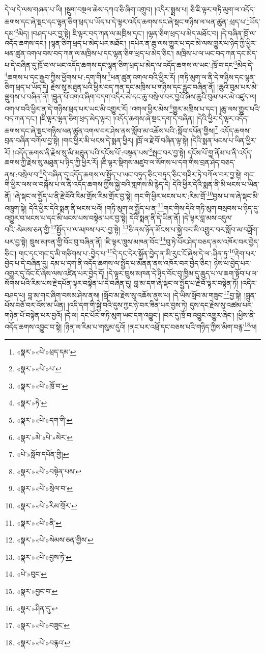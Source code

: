 དེ་ལ་དེ་ལས་གཞན་པ་ཡི། །སྡུག་བསྔལ་ཆེས་དཀའ་ཅི་ཞིག་འགྲུབ། །འདིར་སྨྲས་པ། ཅི་ཇི་ལྟར་གཏི་མུག་ལ་འདོད་ཆགས་དང་ཞེ་སྡང་དང་ལྷན་ཅིག་ཕྲད་པ་ཡོད་པ་དེ་ལྟར་འདོད་ཆགས་དང་ཞེ་སྡང་གཉིས་ལ་ཕན་ཚུན་:ཕྲད་པ་\footnote{«སྣར་»«པེ་»ཕྲད་དམ་}ཡོད་དམ་\footnote{«སྣར་»«པེ་»པ་}མེད། །བཤད་པར་བྱ་སྟེ། ཇི་ལྟར་བད་ཀན་ལ་མཁྲིས་དང་། །ལྷན་ཅིག་ཕྲད་པ་མེད་མཐོང་བ། །དེ་བཞིན་ཁྲོ་ལ་འདོད་ཆགས་དང་། །ལྷན་ཅིག་ཕྲད་པ་མེད་པར་མཐོང་། །དཔེར་ན་ཆུ་ལས་གྱུར་པ་དང་མེ་ལས་གྱུར་པ་ཉིད་ཀྱི་ཕྱིར་ཕན་ཚུན་འགལ་བས་བད་ཀན་ལ་མཁྲིས་པ་དང་ལྷན་ཅིག་ཕྲད་པ་མེད་ཅིང་། མཁྲིས་པ་ལ་ཡང་བད་ཀན་དང་མེད་པ་དེ་བཞིན་དུ་ཁྲོ་བ་ལ་ཡང་འདོད་ཆགས་དང་ལྷན་ཅིག་ཕྲད་པ་མེད་ལ་འདོད་ཆགས་ལ་ཡང་:ཁྲོ་བ་དང་\footnote{«སྣར་»«པེ་»ཁྲོ་བ་}མེད་དེ་\footnote{«སྣར་»ཏེ་}ཆགས་པ་དང་རྒྱབ་ཀྱིས་ཕྱོགས་པ་:དག་གིས་\footnote{«སྣར་»«པེ་»དག་གི་}ཕན་ཚུན་འགལ་བའི་ཕྱིར་རོ། །གཏི་མུག་ལ་ནི་དེ་གཉིས་དང་ལྷན་ཅིག་ཕྲད་པ་ཡོད་དེ། རྗེས་སུ་མཐུན་པའི་ཕྱིར་བད་ཀན་དང་མཁྲིས་པ་གཉིས་དང་རླུང་བཞིན་ནོ། །ཆུའི་བུམ་པར་མེ་ལྡུགས་པ་བཞིན་ནོ། །བླུན་པོ་འགའ་ཞིག་བདག་འདིར་མེ་དང་ཆུ་བསྲེལ་བར་བྱའོ་ཞེས་ཆུའི་བུམ་པར་མེ་འཛུད་ལ། འགལ་བའི་ཕྱིར་ན་དེ་གཉིས་ཕྲད་པར་ཡང་མི་འགྱུར་རོ། །འགལ་ཕྱིར་མེས་\footnote{«སྣར་»མེ་«པེ་»མེར་}གྱུར་མཁྲིས་པ་དང་། །ཆུ་ལས་གྱུར་པའི་བད་ཀན་དང་། །ཇི་ལྟར་ལྷན་ཅིག་ཕྲད་མེད་ལྟར། །འདོད་ཆགས་ཞེ་སྡང་དག་དེ་བཞིན། །དེའི་ཕྱིར་དེ་ལྟར་འདོད་ཆགས་དང་ཞེ་སྡང་གཉིས་ཕན་ཚུན་འགལ་བར་ཤེས་ནས་སློབ་མ་འཆོས་པའི་:སློབ་དཔོན་གྱིས།\footnote{«པེ་»སློབ་དཔོན་གྱི།} འདོད་ཆགས་བྲན་བཞིན་བཀོལ་བྱ་སྟེ། །གང་ཕྱིར་མི་ཕངས་དེ་སྨན་ཕྱིར། །ཁྲོ་ལ་རྗེ་བོ་བཞིན་ལྟ་སྟེ། །དེའི་སྨན་ཕངས་པ་ཡིན་ཕྱིར་རོ། །འདོད་ཆགས་ནི་རྗེས་སུ་མི་མཐུན་པའི་དངོས་པོ་:བསྟན་པས་\footnote{«སྣར་»«པེ་»བསྟེན་པས་}སྤང་བར་བྱ་སྟེ། དངོས་པོ་གྱ་ནོམ་པ་ནི་འདོད་ཆགས་ཀྱི་རྗེས་སུ་མཐུན་པ་ཉིད་ཀྱི་ཕྱིར་རོ། །ཇི་ལྟར་སྡིགས་མཛུབ་ལ་སོགས་པ་དག་གིས་བྲན་ཤེད་བཅད་ནས་:བསྲེལ་བ་\footnote{«སྣར་»«པེ་»སྲེལ་བ་}དེ་བཞིན་དུ་འདོད་ཆགས་ལ་སྤྱོད་པ་ཡང་བཏུད་ཅིང་བཏུད་ཅིང་གཟིར་ཏེ་བཀོལ་བར་བྱ་སྟེ། གང་གི་ཕྱིར་ལས་ལ་བསྐོས་པ་ལ་ནི་འདོད་ཆགས་ཀྱིས་སྐྱེ་བའི་གླགས་མི་རྙེད་དེ། དེའི་ཕྱིར་དེའི་སྨན་ནི་མི་ཕངས་པ་ཡིན་ནོ། །ཞེ་སྡང་ལ་སྤྱོད་པ་ནི་རྗེ་བོའི་རིམ་གྲོས་རིམ་གྲོར་བྱ་སྟེ། གང་གི་ཕྱིར་ཕངས་པར་:རིམ་གྲོ་\footnote{«སྣར་»«པེ་»རིམ་གྲོར་}བྱས་པ་ལ་ཞེ་སྡང་མི་འཁྲུག་སྟེ། དེའི་ཕྱིར་དེའི་སྨན་ནི་ཕངས་པའོ། །གཏི་མུག་ལ་སྤྱོད་པ་ན་\footnote{«སྣར་»«པེ་»ནི་}གང་གིས་དེའི་གཏི་མུག་བསྲབས་པ་ཉིད་དུ་འགྱུར་བ་ཕངས་པ་དང་མི་ཕངས་པས་བསྟེན་པར་བྱ་སྟེ། དེའི་སྨན་ནི་དེ་ཡིན་ནོ། །དེ་ལྟར་བླ་མས་འདུལ་བའི་:སེམས་ཅན་གྱི་\footnote{«སྣར་»«པེ་»སེམས་ཅན་གྱིས་}སྤྱོད་པ་ལ་མཁས་པར་:བྱ་སྟེ། \footnote{«སྣར་»«པེ་»བྱས་ཏེ་}ཅི་ནས་ཉོན་མོངས་པ་སྐྱེ་བར་མི་འགྱུར་བར་སློབ་མ་བཟློག་པར་བྱ་སྟེ། ཁྲུས་མཁན་གྱི་བོང་བུ་བཞིན་ནོ། །ཇི་ལྟར་ཁྲུས་མཁན་བོང་\footnote{«པེ་»བུང་}བུ་ཏེ་པོར་ཤེད་བཅད་ནས་འཁོར་བར་བྱེད་ཅིང་། གང་དང་གང་དུ་མི་གཙིགས་པ་:བྱེད་པ་\footnote{«སྣར་»བྱང་བ་}དེ་དང་དེར་སྐྱོན་བྱེད་ན་མི་རུང་ངོ་ཞེས་དེ་ལ་:ཤིན་ཏུ་\footnote{«སྣར་»ཤིན་དུ་}རྡེག་པར་བྱེད་པ་དེ་བཞིན་དུ། དམ་པ་དག་ནི་འདོད་ཆགས་ལ་སྤྱོད་པ་མནན་ནས་འཁོར་བར་བྱེད་ཅིང་། ཉེས་པ་བྱེད་པར་འགྱུར་དུ་འོང་ངོ་ཞེས་ལས་འཛིན་པར་བྱེད་དོ། །དེ་ལྟར་ཁྲུས་མཁན་དེ་ཉིད་བོང་བུ་ཁྱིམ་དུ་ཆུད་པ་ལ་ཆག་སྟོབ་པ་ལ་སོགས་པའི་རིམ་པས་རྗེ་དཔོན་ལྟར་བསྟེན་པ་དེ་བཞིན་དུ། བླ་མ་དག་ཞེ་སྡང་ལ་སྤྱོད་པ་རྗེ་བོ་ལྟར་བསྟེན་ཏོ། །འདིར་བཤད་པ། བླ་མ་གང་ཞིག་བསམ་ཤེས་ནས། །སློབ་མ་རྗེས་སུ་འཆོས་ནུས་པ། །དེ་ཡིས་སློབ་མ་གཟུང་\footnote{«སྣར་»«པེ་»བཟུང་}བྱ་སྟེ། །བླུན་པོས་བཅོ་བར་འོས་མ་ཡིན། །འདི་དག་གི་སྐྱེ་བའི་དུས་ཀྱང་ཉེ་བར་ཟིན་པར་བྱས་ཏེ། དུས་དང་རྗེས་སུ་འཚམ་པར་གཉེན་པོ་བསྟེན་པར་བྱའོ། །དེ་ལ། དང་པོར་གཏི་མུག་ཡང་དག་འབྱུང་། །བར་དུ་ཁྲོ་བ་འབྱུང་འགྱུར་ཞིང་། །ཕྱིས་ནི་འདོད་ཆགས་འབྱུང་བ་སྟེ། །ཉིན་ལ་རིམ་པ་གསུམ་དུའོ། །ནང་པར་འཕྲོ་དང་བཅས་པའི་གཉིད་ཀྱིས་མིག་བརྙ་\footnote{«སྣར་»«པེ་»བརྙའ་}ལ། 